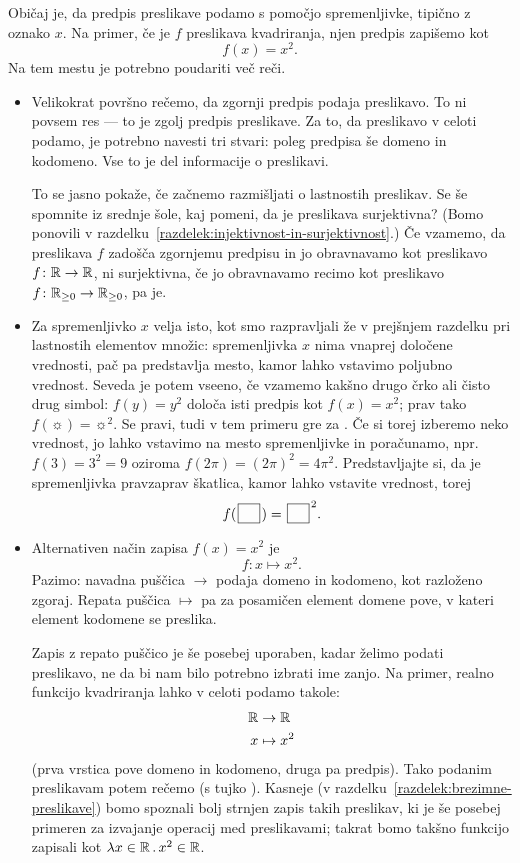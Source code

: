 Običaj je, da predpis preslikave podamo s pomočjo spremenljivke, tipično z oznako $x$. Na primer, če je $f$ preslikava kvadriranja, njen predpis zapišemo kot
\[f(x) = x^2.\]
Na tem mestu je potrebno poudariti več reči.
\begin{itemize}
\item
Velikokrat površno rečemo, da zgornji predpis podaja preslikavo. To ni povsem res --- to je zgolj predpis preslikave. Za to, da preslikavo v celoti podamo, je potrebno navesti tri stvari: poleg predpisa še domeno in kodomeno. Vse to je del informacije o preslikavi.

To se jasno pokaže, če začnemo razmišljati o lastnostih preslikav. Se še spomnite iz srednje šole, kaj pomeni, da je preslikava surjektivna? (Bomo ponovili v razdelku~\ref{razdelek:injektivnost-in-surjektivnost}.) Če vzamemo, da preslikava $f$ zadošča zgornjemu predpisu in jo obravnavamo kot preslikavo $f\colon \mathbb{R} \to \mathbb{R}$, ni surjektivna, če jo obravnavamo recimo kot preslikavo $f\colon \mathbb{R}_{\geq 0} \to \mathbb{R}_{\geq 0}$, pa je.
\item
Za spremenljivko $x$ velja isto, kot smo razpravljali že v prejšnjem razdelku pri lastnostih elementov množic: spremenljivka $x$ nima vnaprej določene vrednosti, pač pa predstavlja mesto, kamor lahko vstavimo poljubno vrednost. Seveda je potem vseeno, če vzamemo kakšno drugo črko ali čisto drug simbol: $f(y) = y^2$ določa isti predpis kot $f(x) = x^2$; prav tako $f(\sun) = \sun^2$. Se pravi, tudi v tem primeru gre za . Če si torej izberemo neko vrednost, jo lahko vstavimo na mesto spremenljivke in poračunamo, npr.~$f(3) = 3^2 = 9$ oziroma $f(2\pi) = (2\pi)^2 = 4\pi^2$. Predstavljajte si, da je spremenljivka pravzaprav škatlica, kamor lahko vstavite vrednost, torej
\[f(\argbox) = \argbox^2.\]
\item
Alternativen način zapisa $f(x) = x^2$ je
\[f\colon x \mapsto x^2.\]
Pazimo: navadna puščica $\to$ podaja domeno in kodomeno, kot razloženo zgoraj. Repata puščica $\mapsto$ pa za posamičen element domene pove, v kateri element kodomene se preslika.

Zapis z repato puščico je še posebej uporaben, kadar želimo podati preslikavo, ne da bi nam bilo potrebno izbrati ime zanjo. Na primer, realno funkcijo kvadriranja lahko v celoti podamo takole:
\begin{align*}
\mathbb{R} &\to \mathbb{R} \\
x &\mapsto x^2
\end{align*}
(prva vrstica pove domeno in kodomeno, druga pa predpis). Tako podanim preslikavam potem rečemo  (s tujko ). Kasneje (v razdelku~\ref{razdelek:brezimne-preslikave}) bomo spoznali bolj strnjen zapis takih preslikav, ki je še posebej primeren za izvajanje operacij med preslikavami; takrat bomo takšno funkcijo zapisali kot $\xlam{x}[\RR]{x^2}[\RR]$.
\end{itemize}

